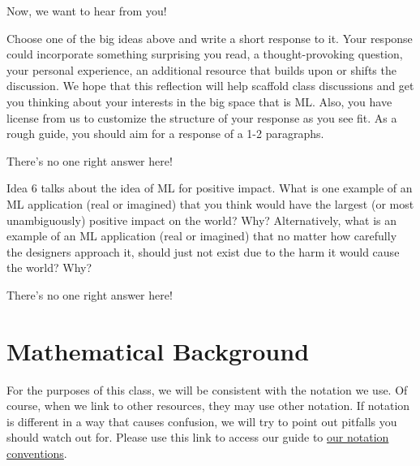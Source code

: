 \documentclass[assignment01_Solutions]{subfiles}
\begin{document}
\begin{exercise}
Now, we want to hear from you!  
\bes
\item Choose one of the big ideas above and write a short response to it.  Your response could incorporate something surprising you read, a thought-provoking question, your personal experience, an additional resource that builds upon or shifts the discussion.  We hope that this reflection will help scaffold class discussions and get you thinking about your interests in the big space that is ML.  Also, you have license from us to customize the structure of your response as you see fit.  As a rough guide, you should aim for a response of a 1-2 paragraphs.

\begin{boxedsolution}
There's no one right answer here!
\end{boxedsolution}

\item Idea 6 talks about the idea of ML for positive impact.  What is one example of an ML application (real or imagined) that you think would have the largest (or most unambiguously) positive impact on the world?  Why?  Alternatively, what is an example of an ML application (real or imagined) that no matter how carefully the designers approach it, should just not exist due to the harm it would cause the world?  Why?

\begin{boxedsolution}
There's no one right answer here!
\end{boxedsolution}

\ees
\end{exercise}

\section{Mathematical Background}


\begin{notice}
For the purposes of this class, we will be consistent with the notation we use.  Of course, when we link to other resources, they may use other notation.  If notation is different in a way that causes confusion, we will try to point out pitfalls you should watch out for.  Please use this link to access our guide to \href{https://github.com/mlfa19/assignments/blob/master/supplementary_documents/notation_conventions.pdf}{our notation conventions}.
\end{notice}
\end{document}
